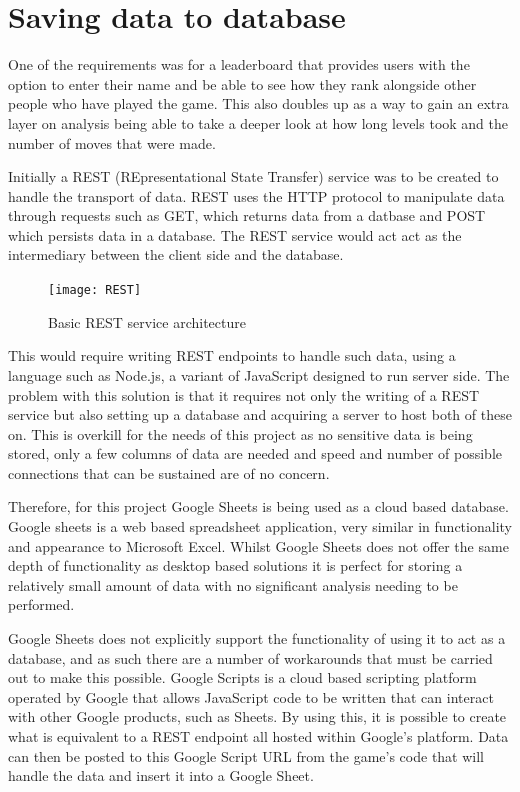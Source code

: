 \documentclass[12pt,a4paper]{report}
\begin{document}
\section{Saving data to database}
One of the requirements was for a leaderboard that provides users with the option to enter their name and be able to see how they rank alongside other people who have played the game. This also doubles up as a way to gain an extra layer on analysis being able to take a deeper look at how long levels took and the number of moves that were made. 

Initially a REST (REpresentational State Transfer) service was to be created to handle the transport of data. REST uses the HTTP protocol to manipulate data through requests such as GET, which returns data from a datbase and POST which persists data in a database. The REST service would act act as the intermediary between the client side and the database.

\begin{figure}[h]
  \centering
  \begin{minipage}[b]{1\textwidth}
    \texttt{[image: REST]}
    \caption{Basic REST service architecture}
  \end{minipage}
\end{figure}
\FloatBarrier

This would require writing REST endpoints to handle such data, using a language such as Node.js, a variant of JavaScript designed to run server side. The problem with this solution is that it requires not only the writing of a REST service but also setting up a database and acquiring a server to host both of these on. This is overkill for the needs of this project as no sensitive data is being stored, only a few columns of data are needed and speed and number of possible connections that can be sustained are of no concern.
 
Therefore, for this project Google Sheets is being used as a cloud based database. Google sheets is a web based spreadsheet application, very similar in functionality and appearance to Microsoft Excel. Whilst Google Sheets does not offer the same depth of functionality as desktop based solutions it is perfect for storing a relatively small amount of data with no significant analysis needing to be performed.

Google Sheets does not explicitly support the functionality of using it to act as a database, and as such there are a number of workarounds that must be carried out to make this possible.
Google Scripts is a cloud based scripting platform operated by Google that allows JavaScript code to be written that can interact with other Google products, such as Sheets. By using this, it is possible to create what is equivalent to a REST endpoint all hosted within Google's platform. 
Data can then be posted to this Google Script URL from the game's code that will handle the data and insert it into a Google Sheet.
\end{document}
